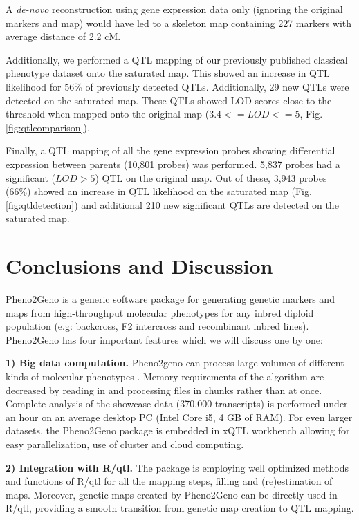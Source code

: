 A \emph{de-novo} reconstruction using gene expression data only (ignoring the original 
markers and map) would have led to a skeleton map containing 227 markers with average 
distance of 2.2 cM. 

Additionally, we performed a QTL mapping of our previously published classical 
phenotype dataset\cite{Joosen:2011} onto the saturated map. This showed an increase in QTL 
likelihood for 56\% of previously detected QTLs. Additionally, 29 new QTLs were detected 
on the saturated map. These QTLs showed LOD scores close to the threshold when mapped 
onto the original map ($ 3.4 <= LOD <= 5$, Fig. \ref{fig:qtlcomparison}).

Finally,  a QTL mapping of all the gene expression probes showing differential expression 
between parents (10,801 probes) was performed. 5,837 probes had a significant ($LOD > 5$) 
QTL on the original map. Out of these, 3,943 probes (66\%) showed an increase in QTL 
likelihood on the saturated map (Fig. \ref{fig:qtldetection}) and additional 210 new significant QTLs are 
detected on the saturated map.
  
\section{Conclusions and Discussion}
Pheno2Geno is a generic software package for generating genetic markers and maps from 
high-throughput molecular phenotypes for any inbred diploid population (e.g: backcross, 
F2 intercross and recombinant inbred lines). Pheno2Geno has four important features which 
we will discuss one by one:

{\bf 1) Big data computation.}
Pheno2geno can process large volumes of different kinds of molecular phenotypes \cite{Trelles:2011}. 
Memory requirements of the algorithm are decreased by reading in and processing 
files in chunks rather than at once. Complete analysis of the showcase data (370,000 transcripts) 
is performed under an hour on an average desktop PC (Intel Core i5, 4 GB of RAM). For even larger 
datasets, the Pheno2Geno package is embedded in xQTL workbench \cite{Arends:2012, Snoek:2012} 
allowing for easy parallelization, use of cluster and cloud computing.

{\bf 2) Integration with R/qtl.}
The package is employing well optimized methods and functions of R/qtl for all the mapping steps,
filling and (re)estimation of maps. Moreover, genetic maps created by Pheno2Geno can be directly 
used in R/qtl, providing a smooth transition from genetic map creation to QTL mapping.

